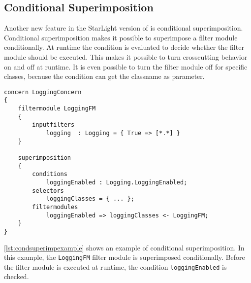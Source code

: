 \subsection{Conditional Superimposition}
Another new feature in the StarLight version of \Compose* is conditional superimposition. Conditional superimposition makes it possible to superimpose a filter module conditionally. At runtime the condition is evaluated to decide whether the filter module should be executed. This makes it possible to turn crosscutting behavior on and off at runtime. It is even possible to turn the filter module off for specific classes, because the condition can get the classname as parameter.

\begin{lstlisting}[language=Composestar,style=listing, caption={Conditional superimposition example},label={lst:condsuperimpexample}]
concern LoggingConcern
{
	filtermodule LoggingFM
	{
		inputfilters
			logging  : Logging = { True => [*.*] }
	}
	
	superimposition
	{
		conditions
		    loggingEnabled : Logging.LoggingEnabled;
		selectors
			loggingClasses = { ... };
		filtermodules
			loggingEnabled => loggingClasses <- LoggingFM;
	}
}
\end{lstlisting}
\autoref{lst:condsuperimpexample} shows an example of conditional superimposition. In this example, the \lstinline|LoggingFM| filter module is superimposed conditionally. Before the filter module is executed at runtime, the condition \lstinline|loggingEnabled| is checked.